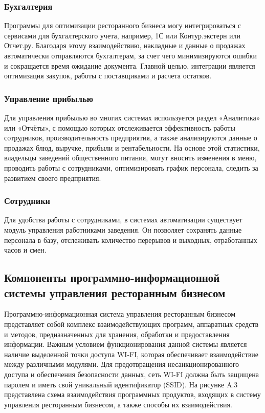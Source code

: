 \subsubsection{Бухгалтерия}
Программы для оптимизации ресторанного бизнеса могу интегрироваться с сервисами для бухгалтерского учета, например, 1С или Контур.экстерн или Отчет.ру. Благодаря этому взаимодействию, накладные и данные о продажах автоматически отправляются бухгалтерам, за счет чего минимизируются ошибки и сокращается время ожидание документа. Главной целью, интеграции является оптимизация закупок, работы с поставщиками и расчета остатков\cite{statoptim}.

\subsubsection{Управление прибылью}
Для управления прибылью во многих системах используется раздел «Аналитика» или «Отчёты», с помощью которых отслеживается эффективность работы сотрудников, производительность предприятия, а также анализируются данные о продажах блюд, выручке, прибыли и рентабельности. На основе этой статистики, владельцы заведений общественного питания, могут вносить изменения в меню, проводить работы с сотрудниками, оптимизировать график персонала, следить за развитием своего предприятия.  

\subsubsection{Сотрудники} 
Для удобства работы с сотрудниками, в системах автоматизации существует модуль управления работниками заведения. Он позволяет сохранять данные персонала в базу, отслеживать количество перерывов и выходных, отработанных часов и смен\cite{siteanaliz}. 


\subsection{Компоненты программно-информационной системы управления ресторанным бизнесом}
Программно-информационная система управления ресторанным бизнесом представляет собой комплекс взаимодействующих программ, аппаратных средств и методов, предназначенных для хранения, обработки и предоставления информации\cite{bisness}. Важным условием функционирования данной системы является наличие выделенной точки доступа WI-FI, которая обеспечивает взаимодействие между различными модулями. Для предотвращения несанкционированного доступа и обеспечения безопасности данных, сеть WI-FI должна быть защищена паролем и иметь свой уникальный идентификатор (SSID). 
На рисунке A.3 представлена схема взаимодействия программных продуктов, входящих в систему управления ресторанным бизнесом, а также способы их взаимодействия\cite{sitkin}.



